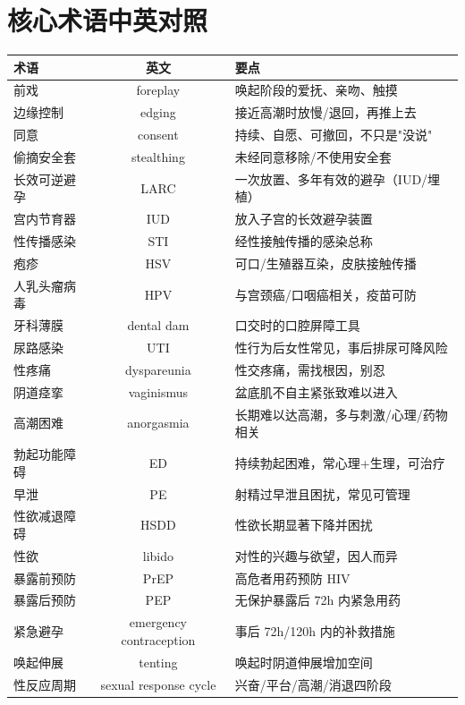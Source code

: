 \documentclass[12pt,UTF8,openany]{ctexbook}
\begin{document}
\section{核心术语中英对照}

\begin{tabularx}{\textwidth}{l C X}
\toprule
术语 & 英文 & 要点 \\
\midrule
前戏 & foreplay & 唤起阶段的爱抚、亲吻、触摸 \\
边缘控制 & edging & 接近高潮时放慢/退回，再推上去 \\
同意 & consent & 持续、自愿、可撤回，不只是"没说" \\
偷摘安全套 & stealthing & 未经同意移除/不使用安全套 \\
长效可逆避孕 & LARC & 一次放置、多年有效的避孕（IUD/埋植） \\
宫内节育器 & IUD & 放入子宫的长效避孕装置 \\
性传播感染 & STI & 经性接触传播的感染总称 \\
疱疹 & HSV & 可口/生殖器互染，皮肤接触传播 \\
人乳头瘤病毒 & HPV & 与宫颈癌/口咽癌相关，疫苗可防 \\
牙科薄膜 & dental dam & 口交时的口腔屏障工具 \\
尿路感染 & UTI & 性行为后女性常见，事后排尿可降风险 \\
性疼痛 & dyspareunia & 性交疼痛，需找根因，别忍 \\
阴道痉挛 & vaginismus & 盆底肌不自主紧张致难以进入 \\
高潮困难 & anorgasmia & 长期难以达高潮，多与刺激/心理/药物相关 \\
勃起功能障碍 & ED & 持续勃起困难，常心理+生理，可治疗 \\
早泄 & PE & 射精过早泄且困扰，常见可管理 \\
性欲减退障碍 & HSDD & 性欲长期显著下降并困扰 \\
性欲 & libido & 对性的兴趣与欲望，因人而异 \\
暴露前预防 & PrEP & 高危者用药预防 HIV \\
暴露后预防 & PEP & 无保护暴露后 72h 内紧急用药 \\
紧急避孕 & emergency contraception & 事后 72h/120h 内的补救措施 \\
唤起伸展 & tenting & 唤起时阴道伸展增加空间 \\
性反应周期 & sexual response cycle & 兴奋/平台/高潮/消退四阶段 \\
\bottomrule
\end{tabularx}
\end{document}
